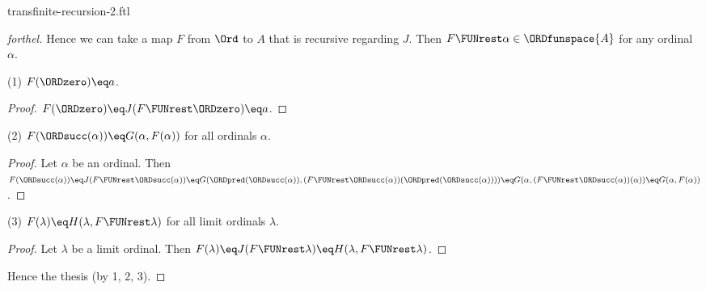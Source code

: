 \documentclass{naproche-library}
\begin{document}
\begin{smodule}[title=Transfinite Recursion II]{transfinite-recursion-2.ftl}
\begin{proof}[forthel]
  Hence we can take a map $F$ from $\Ord$ to $A$ that is recursive regarding $J$.
  Then $F \FUNrest \alpha \in \ORDfunspace{A}$ for any ordinal $\alpha$.

  (1) $F(\ORDzero) \eq a$.
  \begin{proof}
    $F(\ORDzero)
      \eq J(F \FUNrest \ORDzero)
      \eq a$.
  \end{proof}

  (2) $F(\ORDsucc(\alpha)) \eq G(\alpha, F(\alpha))$ for all ordinals $\alpha$.
  \begin{proof}
    Let $\alpha$ be an ordinal.
    Then $F(\ORDsucc(\alpha))
      \eq J(F \FUNrest \ORDsucc(\alpha))
      \eq G(\ORDpred(\ORDsucc(\alpha)), (F \FUNrest \ORDsucc(\alpha))(\ORDpred(\ORDsucc(\alpha))))
      \eq G(\alpha, (F \FUNrest \ORDsucc(\alpha))(\alpha))
      \eq G(\alpha, F(\alpha))$.
  \end{proof}

  (3) $F(\lambda) \eq H(\lambda, F \FUNrest \lambda)$ for all limit ordinals $\lambda$.
  \begin{proof}
    Let $\lambda$ be a limit ordinal.
    Then $F(\lambda)
      \eq J(F \FUNrest \lambda)
      \eq H(\lambda, F \FUNrest \lambda)$.
  \end{proof}

  Hence the thesis (by 1, 2, 3).
\end{proof}
\end{smodule}
\end{document}
